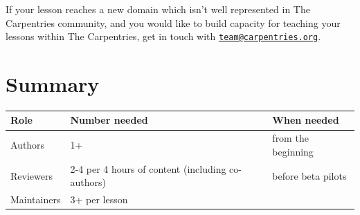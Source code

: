 \documentclass[]{book}
\begin{document}
If your lesson reaches a new domain which isn't well represented in The Carpentries community,
and you would like to build capacity for teaching your lessons within The Carpentries, get in
touch with \href{mailto:team@carpentries.org}{\nolinkurl{team@carpentries.org}}.

\hypertarget{summary}{%
\section{Summary}\label{summary}}

\begin{longtable}[]{@{}lll@{}}
\toprule
\begin{minipage}[b]{0.18\columnwidth}\raggedright
Role\strut
\end{minipage} & \begin{minipage}[b]{0.40\columnwidth}\raggedright
Number needed\strut
\end{minipage} & \begin{minipage}[b]{0.33\columnwidth}\raggedright
When needed\strut
\end{minipage}\tabularnewline
\midrule
\endhead
\begin{minipage}[t]{0.18\columnwidth}\raggedright
Authors\strut
\end{minipage} & \begin{minipage}[t]{0.40\columnwidth}\raggedright
1+\strut
\end{minipage} & \begin{minipage}[t]{0.33\columnwidth}\raggedright
from the beginning\strut
\end{minipage}\tabularnewline
\begin{minipage}[t]{0.18\columnwidth}\raggedright
Reviewers\strut
\end{minipage} & \begin{minipage}[t]{0.40\columnwidth}\raggedright
2-4 per 4 hours of content (including co-authors)\strut
\end{minipage} & \begin{minipage}[t]{0.33\columnwidth}\raggedright
before beta pilots\strut
\end{minipage}\tabularnewline
\begin{minipage}[t]{0.18\columnwidth}\raggedright
Maintainers\strut
\end{minipage} & \begin{minipage}[t]{0.40\columnwidth}\raggedright
3+ per lesson\strut
\end{minipage} & \begin{minipage}[t]{0.33\columnwidth}\raggedright

\end{minipage}
\end{longtable}
\end{document}
